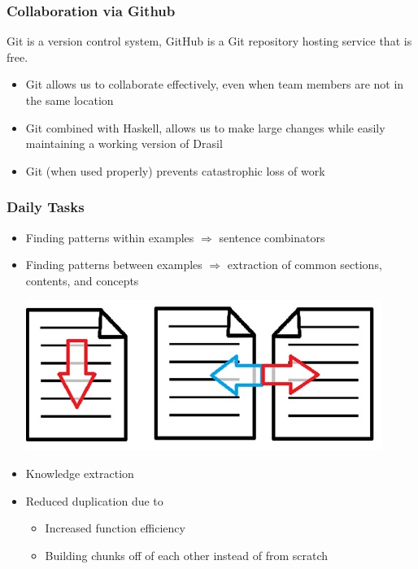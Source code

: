 \documentclass{beamer}
\begin{document}
\begin{frame}
\frametitle{Collaboration via Github}
Git is a version control system, GitHub is a Git repository hosting service that is \alert{free}.
\begin{itemize}
 \item Git allows us to collaborate effectively, even when team members are not in the same location
 \item<1-> Git combined with Haskell, allows us to make large changes while easily maintaining a working version of Drasil
 \item<2-> Git \alert{(when used properly)} prevents catastrophic loss of work
\end{itemize}
\end{frame}

\begin{frame}
\frametitle{Daily Tasks}
\begin{itemize}
 \item<1-> Finding patterns within examples $\Rightarrow$ sentence combinators
 \item<1-> Finding patterns between examples $\Rightarrow$ extraction of common sections, contents, and concepts
 \begin{center}
  \includegraphics[scale=0.6]{../WG2_11/WinAndBwExamples.jpg}
 \end{center}
 \item<2-> Knowledge extraction
 \item<2-> Reduced duplication due to
  \begin{itemize}
   \item Increased function efficiency
   \item Building chunks off of each other instead of from scratch
  \end{itemize}
\end{itemize}
\end{frame}
\end{document}

